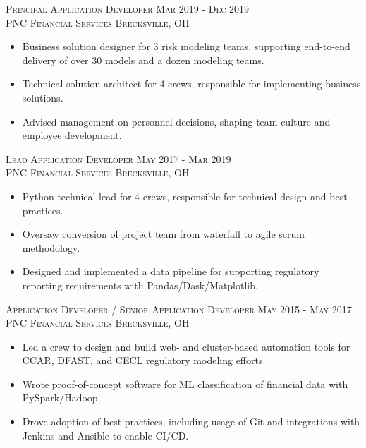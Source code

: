 \documentclass[letterpaper, 10pt]{article} %
\begin{document}
\textsc{Principal Application Developer \hfill Mar 2019 - Dec 2019} \\
\textsc{PNC Financial Services \hfill Brecksville, OH}
\begin{itemize}
 \item Business solution designer for 3 risk modeling teams, supporting end-to-end delivery of over 30 models and a dozen modeling teams.
 \item Technical solution architect for 4 crews, responsible for implementing business solutions.
 \item Advised management on personnel decisions, shaping team culture and employee development.
\end{itemize}

\textsc{Lead Application Developer \hfill May 2017 - Mar 2019} \\
\textsc{PNC Financial Services \hfill Brecksville, OH}
\begin{itemize}
 \item Python technical lead for 4 crews, responsible for technical design and best practices.
 \item Oversaw conversion of project team from waterfall to agile scrum methodology.
 \item Designed and implemented a data pipeline for supporting regulatory reporting requirements with Pandas/Dask/Matplotlib.
\end{itemize}

 \textsc{Application Developer / Senior Application Developer \hfill May 2015 - May 2017} \\
\textsc{PNC Financial Services \hfill Brecksville, OH}
\begin{itemize}
 \item Led a crew to design and build web- and cluster-based automation tools for CCAR, DFAST, and CECL regulatory modeling efforts.
 \item Wrote proof-of-concept software for ML classification of financial data with PySpark/Hadoop.
 \item Drove adoption of best practices, including usage of Git and integrations with Jenkins and Ansible to enable CI/CD.
\end{itemize}
\end{document}
